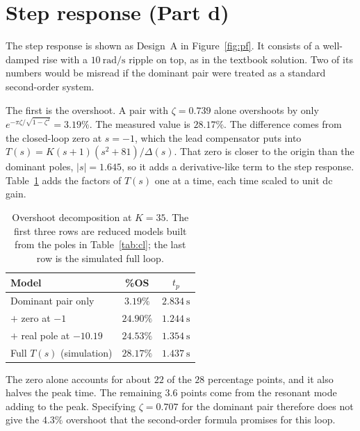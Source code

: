 \documentclass[12pt,a4paper]{article}
\begin{document}
\section{Step response (Part d)}

The step response is shown as Design~A in Figure~\ref{fig:pf}. It consists of a well-damped rise with a \(10~\mathrm{rad/s}\) ripple on top, as in the textbook solution.
Two of its numbers would be misread if the dominant pair were treated as a standard second-order system.

The first is the overshoot.
A pair with \(\zeta=0.739\) alone overshoots by only \(e^{-\pi\zeta/\sqrt{1-\zeta^2}}=3.19\%\).
The measured value is \(28.17\%\).
The difference comes from the closed-loop zero at \(s=-1\), which the lead compensator puts into \(T(s)=K(s+1)(s^2+81)/\Delta(s)\).
That zero is closer to the origin than the dominant poles, \(|s|=1.645\), so it adds a derivative-like term to the step response.
Table~\ref{tab:os} adds the factors of \(T(s)\) one at a time, each time scaled to unit dc gain.

\begin{table}[H]
  \centering
  \caption{Overshoot decomposition at \(K=35\). The first three rows are reduced models built from the poles in Table~\ref{tab:cl}; the last row is the simulated full loop.}
  \label{tab:os}
  \begin{tabular}{lcc}
    \toprule
    Model & \%OS & \(t_p\) \\
    \midrule
    Dominant pair only & \(3.19\%\) & \(2.834~\mathrm{s}\) \\
    \(+\) zero at \(-1\) & \(24.90\%\) & \(1.244~\mathrm{s}\) \\
    \(+\) real pole at \(-10.19\) & \(24.53\%\) & \(1.354~\mathrm{s}\) \\
    Full \(T(s)\) (simulation) & \(28.17\%\) & \(1.437~\mathrm{s}\) \\
    \bottomrule
  \end{tabular}
\end{table}

The zero alone accounts for about \(22\) of the \(28\) percentage points, and it also halves the peak time.
The remaining \(3.6\) points come from the resonant mode adding to the peak.
Specifying \(\zeta=0.707\) for the dominant pair therefore does not give the \(4.3\%\) overshoot that the second-order formula promises for this loop.
\end{document}
